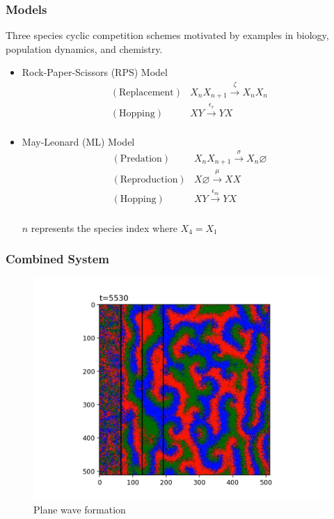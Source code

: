 \documentclass{beamer}
\begin{document}
    \begin{frame}
        \frametitle{Models}

        Three species cyclic competition schemes motivated by examples in biology, population dynamics, and chemistry.
                
        \begin{itemize}
            \item Rock-Paper-Scissors (RPS) Model
                \begin{align*}
                    (\text{Replacement}) & X_nX_{n+1} \xrightarrow{\zeta} X_n X_n\\
                    (\text{Hopping}) & XY \xrightarrow{\epsilon_r} YX \\
                \end{align*}

            \item May-Leonard (ML) Model
                \begin{align*}
                    (\text{Predation}) & X_nX_{n+1} \xrightarrow{\sigma} X_n \varnothing \\
                    (\text{Reproduction}) & X \varnothing \xrightarrow{\mu} XX \\
                    (\text{Hopping}) & XY \xrightarrow{\epsilon_m} YX \\
                \end{align*}

                $ n $ represents the species index where $ X_4 = X_1 $ 
        \end{itemize}
    \end{frame}


    \begin{frame}
        \frametitle{Combined System}
        \begin{figure}[h]
            \centering
            \includegraphics[width=0.75\linewidth]{images/plane_wave_2.jpg}
            \caption{Plane wave formation }
            \label{fig:plane_wave_2}
        \end{figure}
    \end{frame}
\end{document}
